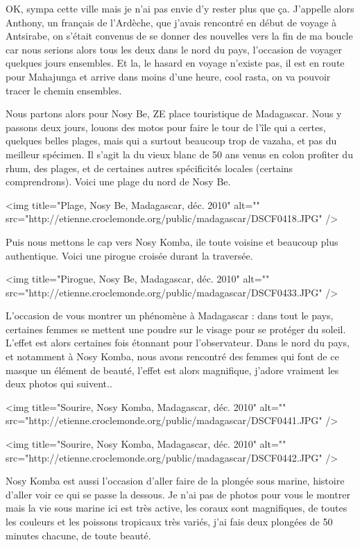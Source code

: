 OK, sympa cette ville mais je n'ai pas envie d'y rester plus que ça. J'appelle alors Anthony, un français de l'Ardèche, que j'avais rencontré en début de voyage à Antsirabe, on s'était convenus de se donner des nouvelles vers la fin de ma boucle car nous serions alors tous les deux dans le nord du pays, l'occasion de voyager quelques jours ensembles. Et la, le hasard en voyage n'existe pas, il est en route pour Mahajunga et arrive dans moins d'une heure, cool rasta, on va pouvoir tracer le chemin ensembles.

Nous partons alors pour Nosy Be, ZE place touristique de Madagascar. Nous y passons deux jours, louons des motos pour faire le tour de l'île qui a certes, quelques belles plages, mais qui a surtout beaucoup trop de vazaha, et pas du meilleur spécimen. Il s'agit la du vieux blanc de 50 ans venus en colon profiter du rhum, des plages, et de certaines autres spécificités locales (certains comprendrons). Voici une plage du nord de Nosy Be.

<img title="Plage, Nosy Be, Madagascar, déc. 2010" alt="" src="http://etienne.croclemonde.org/public/madagascar/DSCF0418.JPG" />

Puis nous mettons le cap vers Nosy Komba, ile toute voisine et beaucoup plus authentique. Voici une pirogue croisée durant la traversée.

<img title="Pirogue, Nosy Be, Madagascar, déc. 2010" alt="" src="http://etienne.croclemonde.org/public/madagascar/DSCF0433.JPG" />

L'occasion de vous montrer un phénomène à Madagascar : dans tout le pays, certaines femmes se mettent une poudre sur le visage pour se protéger du soleil. L'effet est alors certaines fois étonnant pour l'observateur. Dans le nord du pays, et notamment à Nosy Komba, nous avons rencontré des femmes qui font de ce masque un élément de beauté, l'effet est alors magnifique, j'adore vraiment les deux photos qui suivent..

<img title="Sourire, Nosy Komba, Madagascar, déc. 2010" alt="" src="http://etienne.croclemonde.org/public/madagascar/DSCF0441.JPG" />

<img title="Sourire, Nosy Komba, Madagascar, déc. 2010" alt="" src="http://etienne.croclemonde.org/public/madagascar/DSCF0442.JPG" />

Nosy Komba est aussi l'occasion d'aller faire de la plongée sous marine, histoire d'aller voir ce qui se passe la dessous. Je n'ai pas de photos pour vous le montrer mais la vie sous marine ici est très active, les coraux sont magnifiques, de toutes les couleurs et les poissons tropicaux très variés, j'ai fais deux plongées de 50 minutes chacune, de toute beauté.


